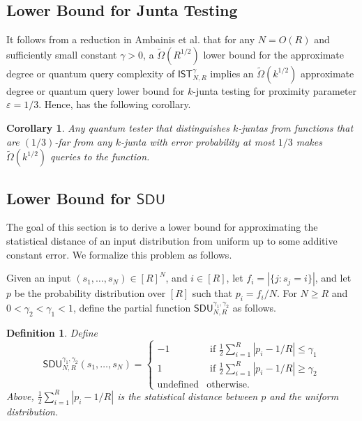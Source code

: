 \documentclass[11pt, letterpaper, fleqn]{article}
\newtheorem{definition}[theorem]{Definition}
\newtheorem{corollary}[theorem]{Corollary}
\theoremstyle{plain}
\newcommand{\SDU}{\mathsf{ SDU}}
\newcommand{\SE}{\mathsf{ IST}}
\newcommand{\eps}{\varepsilon}
\begin{document}
\subsection{Lower Bound for Junta Testing}
It follows from a reduction 
in Ambainis et al. \cite[Section 6]{juntatesting}
 that for any $N=O(R)$ and sufficiently small constant $\gamma > 0$, a $\tilde{\Omega}(R^{1/2})$ lower bound for the approximate
 degree or quantum query complexity of $\SE_{N, R}^{\gamma}$ implies 
 an $\tilde{\Omega}(k^{1/2})$ approximate degree or quantum query lower bound for $k$-junta testing for proximity parameter $\eps = 1/3$. Hence,
  has the following corollary.
 
 \begin{corollary}
Any quantum tester that distinguishes $k$-juntas from functions that are $(1/3)$-far
from any $k$-junta with error probability at most $1/3$ makes $\tilde{\Omega}(k^{1/2})$ queries to the function.
 \end{corollary}

\subsection{Lower Bound for \texorpdfstring{$\SDU$}{SDU}}

The goal of this section is to derive a lower bound
for approximating the statistical distance of an input distribution
from uniform up to some additive constant error. We formalize this problem as follows.

Given an input $(s_1, \dots, s_N) \in [R]^N$, and $i \in [R]$, let
$f_i = |\{j \colon s_j=i\}|$, and let $p$ be the probability distribution over $[R]$
such that $p_i=f_i/N$.  For $N \ge R$ and $0 < \gamma_2 < \gamma_1 < 1$, define the partial function $\SDU_{N, R}^{\gamma_1, \gamma_2}$ as follows. 

\begin{definition} Define $$\SDU_{N, R}^{\gamma_1, \gamma_2}(s_1, \dots, s_N) = \begin{cases} 
-1 & \text{ if } \frac{1}{2} \sum_{i=1}^R |p_i - 1/R| \leq \gamma_1\\
1 & \text{ if } \frac{1}{2} \sum_{i=1}^R |p_i - 1/R| \geq \gamma_2\\
\text{undefined} & \text{otherwise}.\end{cases}$$
Above, $ \frac{1}{2} \sum_{i=1}^R |p_i - 1/R| $ is the statistical
distance between $p$ and the uniform distribution.
\end{definition}
\end{document}
